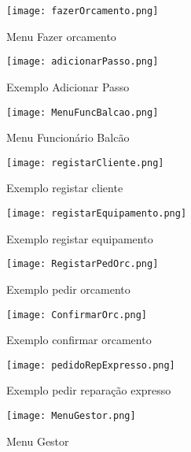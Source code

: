 \documentclass[relatorio.tex]{subfiles}
\begin{document}
\begin{figure}[!ht]
    \centering
    \texttt{[image: fazerOrcamento.png]}
    \caption{Menu Fazer orcamento}
\end{figure}

\begin{figure}[!ht]
    \centering
    \texttt{[image: adicionarPasso.png]}
    \caption{Exemplo Adicionar Passo}
\end{figure}


\begin{figure}[!ht]
    \centering
    \texttt{[image: MenuFuncBalcao.png]}
    \caption{Menu Funcionário Balcão}
\end{figure}

\begin{figure}[!ht]
    \centering
    \texttt{[image: registarCliente.png]}
    \caption{Exemplo registar cliente}
\end{figure}

\begin{figure}[!ht]
    \centering
    \texttt{[image: registarEquipamento.png]}
    \caption{Exemplo registar equipamento}
\end{figure}

\begin{figure}[!ht]
    \centering
    \texttt{[image: RegistarPedOrc.png]}
    \caption{Exemplo pedir orcamento}
\end{figure}

\begin{figure}[!ht]
    \centering
    \texttt{[image: ConfirmarOrc.png]}
    \caption{Exemplo confirmar orcamento}
\end{figure}

\begin{figure}[!ht]
    \centering
    \texttt{[image: pedidoRepExpresso.png]}
    \caption{Exemplo pedir reparação expresso}
\end{figure}

\begin{figure}[!ht]
    \centering
    \texttt{[image: MenuGestor.png]}
    \caption{Menu Gestor}
\end{figure}
\end{document}
